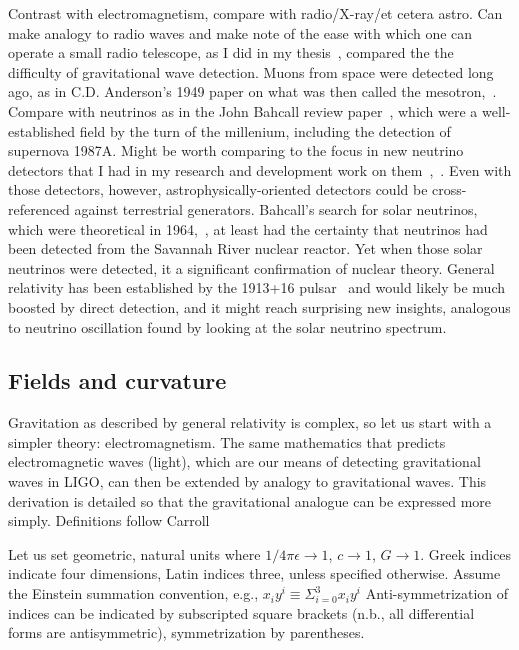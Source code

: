             Contrast with electromagnetism, compare with radio/X-ray/et cetera astro. Can make analogy to radio waves and make note of the ease with which one can operate a small radio telescope, as I did in my thesis~\cite{MeadorsThesis2008}, compared the the difficulty of gravitational wave detection. Muons from space were detected long ago, as in C.D. Anderson's 1949 paper on what was then called the mesotron,~\cite{CDAnderson}. Compare with neutrinos as in the John Bahcall review paper~\cite{NeutrinoReview}, which were a well-established field by the turn of the millenium, including the detection of supernova 1987A. Might be worth comparing to the focus in new neutrino detectors that I had in my research and development work on them~\cite{EBubble2005},~\cite{MeadorsNevis2006}. Even with those detectors, however, astrophysically-oriented detectors could be cross-referenced against terrestrial generators. Bahcall's search for solar neutrinos, which were theoretical in 1964,~\cite{NeutrinosSolarTheoretical}, at least had the certainty that neutrinos had been detected from the Savannah River nuclear reactor. Yet when those solar neutrinos were detected, it a significant confirmation of nuclear theory. General relativity has been established by the 1913+16 pulsar~\cite{WeisbergTaylor2004} and would likely be much boosted by direct detection, and it might reach surprising new insights, analogous to neutrino oscillation found by looking at the solar neutrino spectrum.


\subsection{Fields and curvature}
\label{field_curvature_math}

    
    Gravitation as described by general relativity is complex, so let us start with a simpler theory: electromagnetism. 
The same mathematics that predicts electromagnetic waves (light), which are our means of detecting gravitational waves in LIGO, can then be extended by analogy to gravitational waves.
This derivation is detailed so that the gravitational analogue can be expressed more simply.
Definitions follow Carroll~\cite{Carroll1997}

    Let us set geometric, natural units where $1/4\pi\epsilon \rightarrow 1$, $c \rightarrow 1$, $G \rightarrow 1$. 
Greek indices indicate four dimensions, Latin indices three, unless specified otherwise.
Assume the Einstein summation convention, e.g., $x_i y^i \equiv \Sigma_{i=0}^3 x_i y^i$
Anti-symmetrization of indices can be indicated by subscripted square brackets (n.b., all differential forms are antisymmetric), symmetrization by parentheses.

